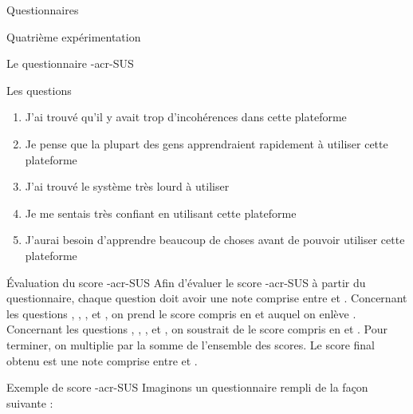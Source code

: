 \documentclass[myfrancais,ngerman,english,frenchb]{mythesis}
\begin{document}
\begin{mychapter}{Questionnaires}
\begin{mysection}{Quatrième expérimentation}
\begin{mysubsection}{Le questionnaire \myacronl-{acr-SUS}}
\begin{mysubsubsection}{Les questions}
\begin{enumerate}[label={Q\arabic*.},ref={Q\arabic*}]
						\item J'ai trouvé qu'il y avait trop d'incohérences dans cette plateforme
						\item Je pense que la plupart des gens apprendraient rapidement à utiliser cette plateforme
						\item J'ai trouvé le système très lourd à utiliser
						\item Je me sentais très confiant en utilisant cette plateforme
						\item J'aurai besoin d'apprendre beaucoup de choses avant de pouvoir utiliser cette plateforme
					\end{enumerate}
				\end{mysubsubsection}
				\begin{mysubsubsection}{Évaluation du score \myacronl-{acr-SUS}}
					Afin d'évaluer le score \myacro-{acr-SUS} à partir du questionnaire, chaque question doit avoir une note comprise entre  et .
					Concernant les questions , , ,  et , on prend le score compris en  et  auquel on enlève .
					Concernant les questions , , ,  et , on soustrait de  le score compris en  et .
					Pour terminer, on multiplie par  la somme de l'ensemble des scores.
					Le score final obtenu est une note comprise entre  et .
				\end{mysubsubsection}
				\begin{mysubsubsection}{Exemple de score \myacronl-{acr-SUS}}
					Imaginons un questionnaire rempli de la façon suivante :
					\newcommand{\mySUSplus}[1]{%
						\fpRegSet{mySUSplus}{1}
						\fpRegSet{myscore}{#1}%
						\fpRegSub{myscore}{mySUSplus}%
						\fpRegRound{myscore}{0}%
						\fpRegGet{myscore}{\myscore}%
						réponse \textcolor{mygreen}{\mynum{#1}} $\Rightarrow$ score $\textcolor{mygreen}{\mynum{#1}} - 1 = \textcolor{myred}{\mynum{\myscore}}$%
					}
					\newcommand{\mySUSminus}[1]{%
						\fpRegSet{mylevel}{5}
						\fpRegSet{myscore}{#1}
						\fpRegSub{mylevel}{myscore}%
						\fpRegRound{mylevel}{0}%
						\fpRegGet{mylevel}{\myscore}%
						réponse \textcolor{mygreen}{\mynum{#1}} $\Rightarrow$ score $5 - \textcolor{mygreen}{\mynum{#1}} = \textcolor{myred}{\mynum{\myscore}}$%
					}
					\begin{enumerate}[label={Q\arabic*.},ref={Q\arabic*}]

\end{enumerate}
\end{mysubsubsection}
\end{mysubsection}
\end{mysection}
\end{mychapter}
\end{document}

